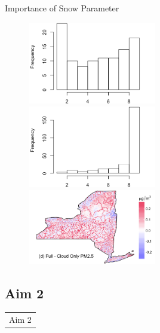 \documentclass{beamer}
\begin{document}
\begin{frame}{Importance of Snow Parameter}
    \begin{figure}
        \centering
        \includegraphics[width=0.5\textwidth]{img/appendix/Aim1/snow_before.png}
        \includegraphics[width=0.5\textwidth]{img/appendix/Aim1/snow_after.png}\\
        \includegraphics[width=0.5\textwidth]{img/appendix/Aim1/figure44.png}
    \end{figure}
\end{frame}


\subsection*{Aim 2}

\begin{frame}{}
    \begin{table}
        \LARGE
        \centering
        \begin{tabular}{c}
             \textcolor[rgb]{0.1,0.1,0.6}{Aim 2}
        \end{tabular}
    \end{table}
\end{frame}
\end{document}
